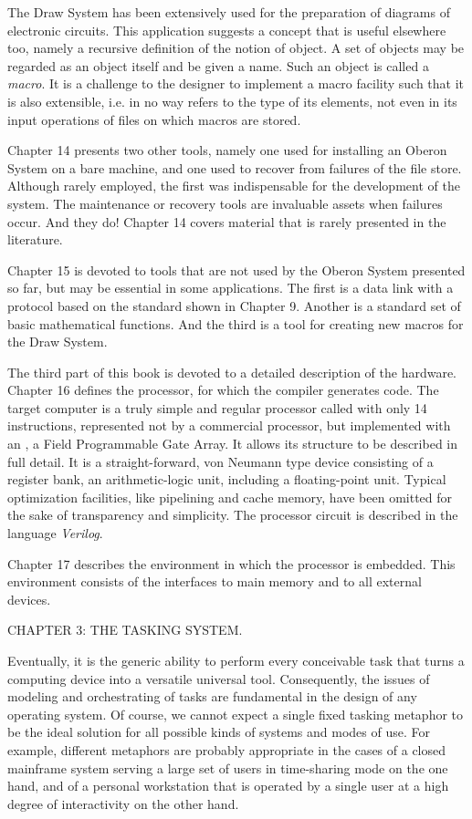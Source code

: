 The Draw System has been extensively used for the preparation of
diagrams of electronic circuits. This application suggests a concept
that is useful elsewhere too, namely a recursive definition of the
notion of object. A set of objects may be regarded as an object itself
and be given a name. Such an object is called a \emph{macro}. It is a
challenge to the designer to implement a macro facility such that it
is also extensible, i.e. in no way refers to the type of its elements,
not even in its input operations of files on which macros are stored.

Chapter 14 presents two other tools, namely one used for installing an
Oberon System on a bare machine, and one used to recover from failures
of the file store. Although rarely employed, the first was
indispensable for the development of the system. The maintenance or
recovery tools are invaluable assets when failures occur. And they do!
Chapter 14 covers material that is rarely presented in the literature.

Chapter 15 is devoted to tools that are not used by the Oberon System
presented so far, but may be essential in some applications. The first
is a data link with a protocol based on the  standard shown in
Chapter 9. Another is a standard set of basic mathematical
functions. And the third is a tool for creating new macros for the
Draw System.

The third part of this book is devoted to a detailed description of
the hardware. Chapter 16 defines the processor, for which the compiler
generates code. The target computer is a truly simple and regular
processor called  with only 14 instructions, represented not by a
commercial processor, but implemented with an , a Field
Programmable Gate Array. It allows its structure to be described in
full detail. It is a straight-forward, von Neumann type device
consisting of a register bank, an arithmetic-logic unit, including a
floating-point unit. Typical optimization facilities, like pipelining
and cache memory, have been omitted for the sake of transparency and
simplicity. The processor circuit is described in the language
\emph{Verilog}.

Chapter 17 describes the environment in which the processor is
embedded. This environment consists of the interfaces to main memory
and to all external devices.

\beginchapter CHAPTER 3: THE TASKING SYSTEM.

Eventually, it is the generic ability to perform every conceivable
task that turns a computing device into a versatile universal
tool. Consequently, the issues of modeling and orchestrating of tasks
are fundamental in the design of any operating system. Of course, we
cannot expect a single fixed tasking metaphor to be the ideal solution
for all possible kinds of systems and modes of use. For example,
different metaphors are probably appropriate in the cases of a closed
mainframe system serving a large set of users in time-sharing mode on
the one hand, and of a personal workstation that is operated by a
single user at a high degree of interactivity on the other hand.

